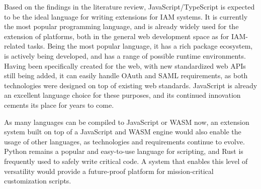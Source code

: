 Based on the findings in the literature review, JavaScript/TypeScript is expected to be the ideal language for writing extensions for IAM systems. It is currently the most popular programming language, and is already widely used for the extension of platforms, both in the general web development space as for IAM-related tasks. Being the most popular language, it has a rich package ecosystem, is actively being developed, and has a range of possible runtime environments. Having been specifically created for the web, with new standardized web APIs still being added, it can easily handle OAuth and SAML requirements, as both technologies were designed on top of existing web standards. JavaScript is already an excellent language choice for these purposes, and its continued innovation cements its place for years to come.

As many languages can be compiled to JavaScript or WASM now, an extension system built on top of a JavaScript and WASM engine would also enable the usage of other languages, as technologies and requirements continue to evolve. Python remains a popular and easy-to-use language for scripting, and Rust is frequently used to safely write critical code. A system that enables this level of versatility would provide a future-proof platform for mission-critical customization scripts.

